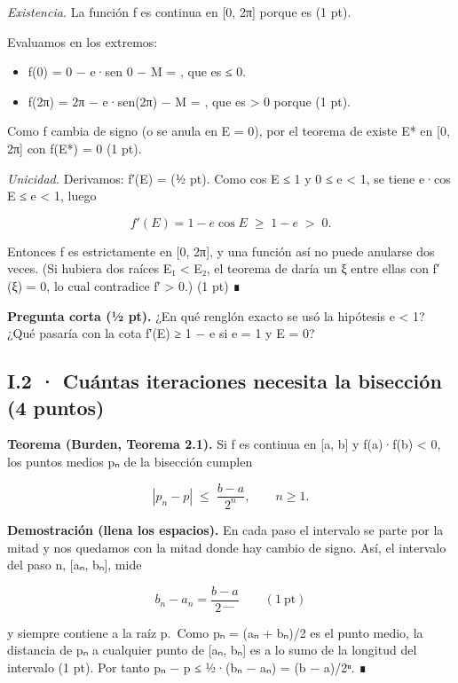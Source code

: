 \emph{Existencia.} La función f es continua en {[}0, 2π{]} porque es  (1 pt).

Evaluamos en los extremos:

\begin{itemize}
\tightlist
\item
  f(0) = 0 − e·sen 0 − M =  , que es ≤ 0.
\item
  f(2π) = 2π − e·sen(2π) − M =  , que es \textgreater{} 0 porque  (1 pt).
\end{itemize}

Como f cambia de signo (o se anula en E = 0), por el teorema de  existe E* en {[}0, 2π{]} con f(E*) = 0 (1 pt).

\emph{Unicidad.} Derivamos: f′(E) =  (½ pt). Como \textbar cos E\textbar{} ≤ 1 y 0 ≤ e \textless{} 1, se tiene e·cos E ≤ e \textless{} 1, luego

\[f'(E) = 1 - e\cos E \;\geq\; 1 - e \;>\; 0 .\]

Entonces f es estrictamente  en {[}0, 2π{]}, y una función así no puede anularse dos veces. (Si hubiera dos raíces E₁ \textless{} E₂, el teorema de  daría un ξ entre ellas con f′(ξ) = 0, lo cual contradice f′ \textgreater{} 0.) (1 pt) ∎

\textbf{Pregunta corta (½ pt).} ¿En qué renglón exacto se usó la hipótesis e \textless{} 1? ¿Qué pasaría con la cota f′(E) ≥ 1 − e si e = 1 y E = 0?


\subsection{I.2 · Cuántas iteraciones necesita la bisección (4 puntos)}

\textbf{Teorema (Burden, Teorema 2.1).} Si f es continua en {[}a, b{]} y f(a)·f(b) \textless{} 0, los puntos medios pₙ de la bisección cumplen

\[|p_n - p| \;\leq\; \frac{b-a}{2^n}, \qquad n \geq 1 .\]

\textbf{Demostración (llena los espacios).} En cada paso el intervalo se parte por la mitad y nos quedamos con la mitad donde hay cambio de signo. Así, el intervalo del paso n, {[}aₙ, bₙ{]}, mide

\[b_n - a_n = \frac{b-a}{2^{\,\_\_\_\_}} \qquad (1\ \text{pt})\]

y siempre contiene a la raíz p.~Como pₙ = (aₙ + bₙ)/2 es el punto medio, la distancia de pₙ a cualquier punto de {[}aₙ, bₙ{]} es a lo sumo  de la longitud del intervalo (1 pt). Por tanto \textbar pₙ − p\textbar{} ≤ ½·(bₙ − aₙ) = (b − a)/2ⁿ. ∎

